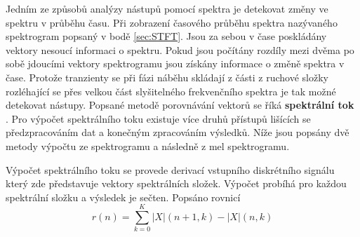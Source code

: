   Jedním ze způsobů analýzy nástupů pomocí spektra je detekovat změny ve spektru v průběhu času. Při zobrazení časového průběhu spektra nazývaného spektrogram popsaný v bodě \ref{sec:STFT}.
  Jsou za sebou v čase poskládány vektory nesoucí informaci o spektru.
  Pokud jsou počítány rozdíly mezi dvěma po sobě jdoucími vektory spektrogramu jsou získány informace o změně spektra v čase.
  Protože tranzienty se při fázi náběhu skládají z části z ruchové složky rozléhající se přes velkou část slyšitelného frekvenčního spektra je tak možné detekovat nástupy.
  Popsané metodě porovnávání vektorů se říká \textbf{spektrální tok} \cite{fundamental_of_music_processing}.
  Pro výpočet spektrálního toku existuje více druhů přístupů lišících se předzpracováním dat a konečným zpracováním výsledků.
  Níže jsou popsány dvě metody výpočtu ze spektrogramu a následně z mel spektrogramu.

  Výpočet spektrálního toku se provede derivací vstupního diskrétního signálu který zde představuje vektory spektrálních složek. Výpočet probíhá pro každou spektrální složku a výsledek je sečten. Popsáno rovnicí 
\begin{equation}
  r(n) = \sum_{k = 0}^{K} |X|(n+1,k) - |X|(n,k)
\end{equation}

